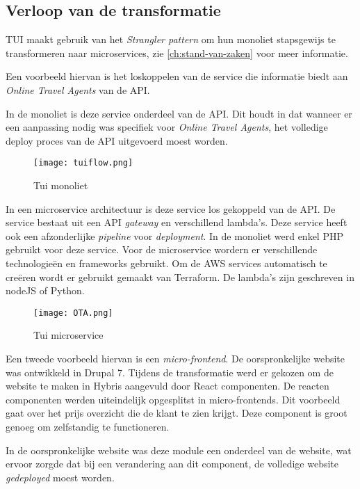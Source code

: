 \subsection{Verloop van de transformatie}

TUI maakt gebruik van het \emph{Strangler pattern} om hun monoliet stapsgewijs te transformeren naar microservices, zie \ref{ch:stand-van-zaken} voor meer informatie.

Een voorbeeld hiervan is het loskoppelen van de service die informatie biedt aan \emph{Online Travel Agents} van de API.

In de monoliet is deze service onderdeel van de API. Dit houdt in dat wanneer er een aanpassing nodig was specifiek voor \emph{Online Travel Agents}, het volledige deploy proces van de API uitgevoerd moest worden.

\begin{figure}[!htb]
    \centering
    \texttt{[image: tuiflow.png]}
    \caption{Tui monoliet \label{tuiflow}}
\end{figure}

In een microservice architectuur is deze service los gekoppeld van de API. De service bestaat uit een API \emph{gateway} en verschillend lambda's. Deze service heeft ook een afzonderlijke \emph{pipeline} voor \emph{deployment}. In de monoliet werd enkel PHP gebruikt voor deze service. Voor de microservice wordern er verschillende technologieën en frameworks gebruikt. Om de AWS services automatisch te creëren wordt er gebruikt gemaakt van Terraform. De lambda's zijn geschreven in nodeJS of Python. 

\begin{figure}[!htb]
    \centering
    \texttt{[image: OTA.png]}
    \caption{Tui microservice \label{tuimicro}}
\end{figure}

Een tweede voorbeeld hiervan is een \emph{micro-frontend}. De oorspronkelijke website was ontwikkeld in Drupal 7. Tijdens de transformatie werd er gekozen om de website te maken in Hybris aangevuld door React componenten. De reacten componenten werden uiteindelijk opgesplitst in micro-frontends. Dit voorbeeld gaat over het prijs overzicht die de klant te zien krijgt. Deze component is groot genoeg om zelfstandig te functioneren. 

In de oorspronkelijke website was deze module een onderdeel van de website, wat ervoor zorgde dat bij een verandering aan dit component, de volledige website \emph{gedeployed} moest worden.

